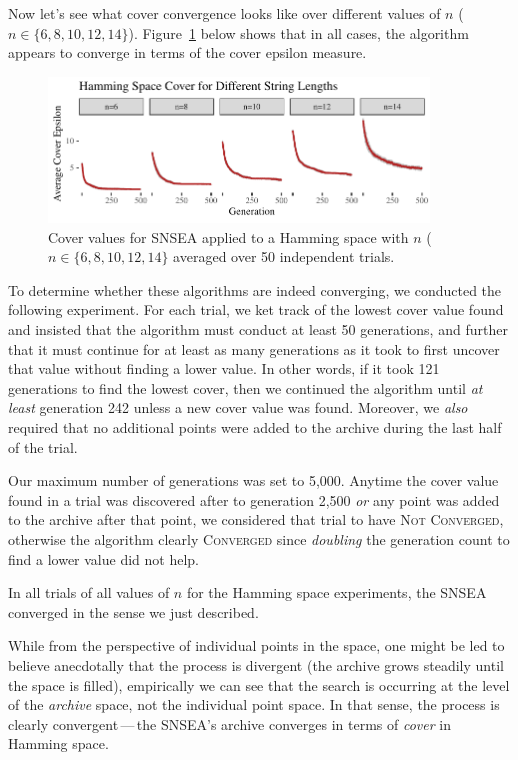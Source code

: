 \documentclass[twoside]{article}
\begin{document}
Now let's see what cover convergence looks like over different values of $n$ ($n\in\{6, 8, 10, 12, 14\}$).  Figure~\ref{fig:hamming:nopop:sm} below shows that in all cases, the algorithm appears to converge in terms of the cover epsilon measure.
%
\begin{figure}[t]
  \center\includegraphics[width=0.9\textwidth]{Figures/hamming-500sm-NOPOP.pdf}
  \caption{\label{fig:hamming:nopop:sm} Cover values for SNSEA applied to a Hamming space with $n$ ($n\in\{6, 8, 10, 12, 14\}$ averaged over 50 independent trials.}
\end{figure}
%

To determine whether these algorithms are indeed converging, we conducted the following experiment.  For each trial, we ket track of the lowest cover value found and insisted that the algorithm must conduct at least 50 generations, and further that it must continue for at least as many generations as it took to first uncover that value without finding a lower value.  In other words, if it took 121 generations to find the lowest cover, then we continued the algorithm until \emph{at least} generation 242 unless a new cover value was found.  Moreover, we \emph{also} required that no additional points were added to the archive during the last half of the trial.

Our maximum number of generations was set to 5,000.  Anytime the cover value found in a trial was discovered after to generation 2,500 \emph{or} any point was added to the archive after that point, we considered that trial to have \textsc{Not Converged}, otherwise the algorithm clearly \textsc{Converged} since \emph{doubling} the generation count to find a lower value did not help.  

In all trials of all values of $n$  for the Hamming space experiments, the SNSEA converged in the sense we just described.

While from the perspective of individual points in the space, one might be led to believe anecdotally that the process is divergent (the archive grows steadily until the space is filled), empirically we can see that the search is occurring at the level of the \emph{archive} space, not the individual point space.  In that sense, the process is clearly convergent\,---\,the SNSEA's archive converges in terms of \emph{cover} in Hamming space.
\end{document}

